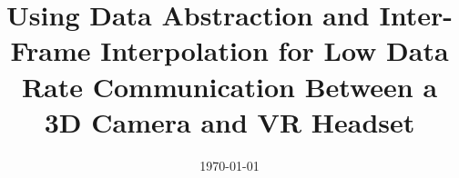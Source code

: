 \documentclass[a4paper, 12pt, twoside]{Thesis}  %
\begin{document}
\frontmatter      %

\title  {Using Data Abstraction and Inter-Frame Interpolation for Low Data Rate Communication Between a 3D Camera and VR Headset}
\addresses  {\groupname\\\deptname\\\univname}  %
\date       {\today}
\subject    {}
\keywords   {}

\maketitle


\fancyhead{}  %
\rhead{\thepage}  %
\lhead{}  %

\pagestyle{fancy}  %


\end{document}
